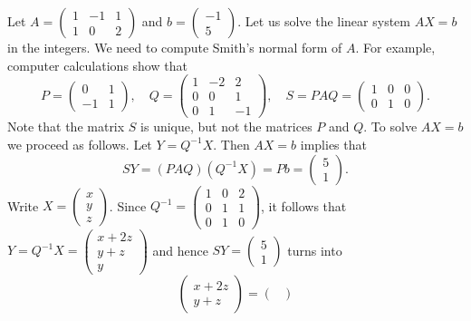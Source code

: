 \begin{example}
	Let $A=\begin{pmatrix}
		1 & -1 & 1\\
		1 & 0 & 2
	\end{pmatrix}$ and $b=\begin{pmatrix} -1 \\ 5\end{pmatrix}$. Let us solve
	the linear system $AX=b$ in the integers. We need to compute
	Smith's normal form of $A$. For example, computer calculations show that
	\[
	P=\begin{pmatrix}
		0 & 1\\
		-1 & 1
	\end{pmatrix},\quad
	Q=\begin{pmatrix}
		1 & -2 & 2\\
		0 & 0 & 1\\
		0 & 1 & -1
	\end{pmatrix},
	\quad
	S=PAQ=\begin{pmatrix}
		1 & 0 & 0\\
		0 & 1 & 0
	\end{pmatrix}.
	\]
	Note that the matrix $S$ is unique, but not the 
	matrices $P$ and $Q$. To solve $AX=b$ we proceed as follows. Let 
	$Y=Q^{-1}X$. Then $AX=b$ implies that 
	\[
		SY=(PAQ)(Q^{-1}X)=Pb=\begin{pmatrix} 5 \\ 1\end{pmatrix}.
	\]	
	Write $X=\begin{pmatrix}
		x\\
		y\\
		z
	\end{pmatrix}$. Since $Q^{-1}=\begin{pmatrix}
		1 & 0 & 2\\
		0 & 1 & 1\\
		0 & 1 & 0
	\end{pmatrix}$, it follows that  
	$Y=Q^{-1}X=\begin{pmatrix}
		x+2z\\
		y+z\\
		y
	\end{pmatrix}$ and hence $SY=\begin{pmatrix}5\\1\end{pmatrix}$ turns into 
	\[
		\begin{pmatrix}
			x+2z\\
			y+z
		\end{pmatrix}
		=
	\begin{pmatrix}

\end{pmatrix}\]
\end{example}
